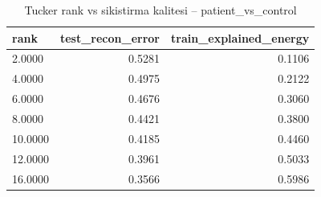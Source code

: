 \begin{table}[htbp]
  \centering
  \caption{Tucker rank vs sikistirma kalitesi -- patient\_vs\_control}
  \label{tab:compression_patient_vs_control}
  \small
  \begin{tabular}{lrr}
    \toprule
    rank & test\_recon\_error & train\_explained\_energy \\
    \midrule
    2.0000 & 0.5281 & 0.1106 \\
    4.0000 & 0.4975 & 0.2122 \\
    6.0000 & 0.4676 & 0.3060 \\
    8.0000 & 0.4421 & 0.3800 \\
    10.0000 & 0.4185 & 0.4460 \\
    12.0000 & 0.3961 & 0.5033 \\
    16.0000 & 0.3566 & 0.5986 \\
    \bottomrule
  \end{tabular}
\end{table}
